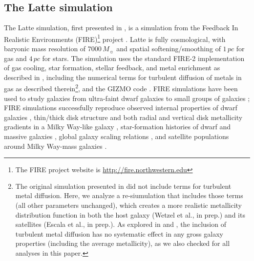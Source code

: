 \documentclass[apj, twocolappendix, numberedappendix, appendixfloats]{emulateapj}
\begin{document}
\subsection{The Latte simulation}
\label{sec:latte}
The Latte simulation, first presented in \citet{wetzel2016}, is a simulation from the Feedback In Realistic Environments (FIRE)\footnote{The FIRE project website is \url{http://fire.northwestern.edu}} project \citep{hopkins2014FIRE}. Latte is fully cosmological, with baryonic mass resolution of $7000 \,M_{\sun}$ and spatial softening/smoothing of $1\,pc$ for gas and $4\,pc$ for stars.
The simulation uses the standard FIRE-2 implementation of gas cooling, star formation, stellar feedback, and metal enrichment as described in \citet{hopkins2017}, including the numerical terms for turbulent diffusion of metals in gas as described therein\footnote{
The original simulation presented in \citet{wetzel2016} did not include terms for turbulent metal diffusion.
Here, we analyze a re-siumulation that includes those terms (all other parameters unchanged), which creates a more realistic metallicity distribution function in both the host galaxy (Wetzel et al., in prep.) and its satellites (Escala et al., in prep.).
As explored in \citet{Su2016} and \citet{hopkins2017}, the inclusion of turbulent metal diffusion has no systematic effect in any gross galaxy properties (including the average metallicity), as we also checked for all analyses in this paper.
}, and the GIZMO code \citep{hopkins2015}. FIRE simulations have been used to study galaxies from ultra-faint dwarf galaxies \citep{wheeler2015} to small groups of galaxies \citep{feldmann2016}; FIRE simulations successfully reproduce observed internal properties of dwarf galaxies \citep{chan:fire.dwarf.cusps, elbadry2016}, thin/thick disk structure and both radial and vertical disk metallicity gradients in a Milky Way-like galaxy \citep{ma2016}, star-formation histories of dwarf and massive galaxies \citep{hopkins2014, sparre:sfmainsequence}, global galaxy scaling relations \citep{hopkins2014, ma:mass.metallicity, feldmann2016}, and satellite populations around Milky Way-mass galaxies \citep{wetzel2016}.
\end{document}
